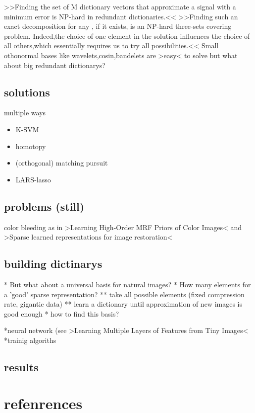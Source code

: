 \begin{frame}
>>Finding the set of M dictionary vectors that approximate a signal with a minimum
error is NP-hard in redundant dictionaries.<<
>>Finding such an exact decomposition for any , if it exists, is an NP-hard three-sets
covering problem. Indeed,the choice of one element in the solution influences the
choice of all others,which essentially requires us to try all possibilities.<<
Small othonormal bases like wavelets,cosin,bandelets are >easy< to solve but what about big redundant dictionarys?
\end{frame}

\subsection{solutions}
\begin{frame}
multiple ways
\begin{itemize}
\item K-SVM
\item homotopy
\item (orthogonal) matching pursuit
\item LARS-lasso
\end{itemize}
\end{frame}

\subsection{problems (still)}
\begin{frame}
color bleeding as in >Learning High-Order MRF Priors of Color Images< and >Sparse learned representations for image restoration<
\end{frame}

\subsection{building dictinarys}
\begin{frame}
* But what about a universal basis for natural images? 
* How many elements for a 'good' sparse representation?
** take all possible elements (fixed compression rate, gigantic data)
** learn a dictionary until approximation of new images is good enough
* how to find this basis?
\end{frame}

\begin{frame}
*neural network (see >Learning Multiple Layers of Features from Tiny Images<
*trainig algoriths
\end{frame}

\subsection{results}
\begin{frame}
\end{frame}

\section{refenrences}
\begin{frame}


\nocite{}


\end{frame}

